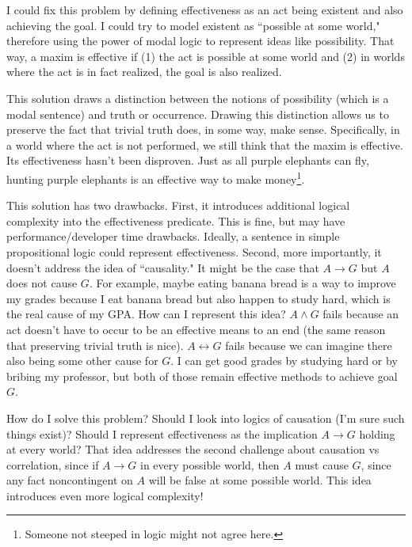 \begin{isabellebody}
\begin{isamarkuptext}
I could fix this problem by defining effectiveness as an act being existent and 
also achieving the goal. I could try to model existent as ``possible at some world," therefore using 
the power of modal logic to represent ideas like possibility. That way, a maxim is effective if (1) 
the act is possible at some world and (2) in worlds where the act is in fact realized, the goal is also
realized. 

This solution draws a distinction between the notions of possibility (which is a modal
sentence) and truth or occurrence. Drawing this distinction 
allows us to preserve the fact that trivial truth does, in some way, make sense. Specifically, in a world 
where the act is not performed, we still think that the maxim is effective. Its effectiveness hasn't been 
disproven. Just as all purple elephants can fly, hunting purple elephants is an effective way to make money\footnote{Someone not steeped in logic might not agree here.}.

This solution has two drawbacks. First, it introduces additional logical complexity into the effectiveness
predicate. This is fine, but may have performance/developer time drawbacks. Ideally, a sentence in simple propositional
logic could represent effectiveness. Second, more importantly, it doesn't address the idea of ``causality." 
It might be the case that $A \longrightarrow G$ but $A$ does not cause $G$. For example, maybe eating 
banana bread is a way to improve my grades because I eat banana bread but also happen to study hard, which 
is the real cause of my GPA. How can I represent this idea? $A \wedge G$ fails because an act doesn't have to occur to be an effective means to an end 
(the same reason that preserving trivial truth is nice). $A \longleftrightarrow G$ fails because we can imagine
there also being some other cause for $G$. I can get good grades by studying hard or by bribing my professor, but
both of those remain effective methods to achieve goal $G$. 

How do I solve this problem? Should I look into logics of causation (I'm sure such things exist)? 
Should I represent effectiveness as the implication $A \longrightarrow G$ holding at every world? That 
idea addresses the second challenge about causation vs correlation, since if  $A \longrightarrow G$ in
every possible world, then $A$ must cause $G$, since any fact noncontingent on $A$ will be false at some 
possible world. This idea introduces even more logical complexity!%
\end{isamarkuptext}\isamarkuptrue%
%
\isadelimtheory
%
\endisadelimtheory
%
\isatagtheory
%
\endisatagtheory
{\isafoldtheory}%
%
\isadelimtheory
%
\endisadelimtheory
%
\end{isabellebody}%
